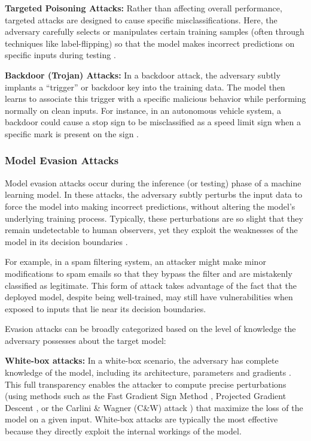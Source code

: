 \documentclass[conference]{IEEEtran}
\begin{document}
\textbf{Targeted Poisoning Attacks:}
Rather than affecting overall performance, targeted attacks are designed to cause specific misclassifications. Here, the adversary carefully selects or manipulates certain training samples (often through techniques like label-flipping) so that the model makes incorrect predictions on specific inputs during testing \cite{pauling2022tutorial}.

\textbf{Backdoor (Trojan) Attacks:}
In a backdoor attack, the adversary subtly implants a “trigger” or backdoor key into the training data. The model then learns to associate this trigger with a specific malicious behavior while performing normally on clean inputs. For instance, in an autonomous vehicle system, a backdoor could cause a stop sign to be misclassified as a speed limit sign when a specific mark is present on the sign \cite{chen2017targeted}.


\subsubsection{Model Evasion Attacks}
Model evasion attacks occur during the inference (or testing) phase of a machine learning model. In these attacks, the adversary subtly perturbs the input data to force the model into making incorrect predictions, without altering the model’s underlying training process. Typically, these perturbations are so slight that they remain undetectable to human observers, yet they exploit the weaknesses of the model in its decision boundaries \cite{golla2023security, pauling2022tutorial}.

For example, in a spam filtering system, an attacker might make minor modifications to spam emails so that they bypass the filter and are mistakenly classified as legitimate. This form of attack takes advantage of the fact that the deployed model, despite being well-trained, may still have vulnerabilities when exposed to inputs that lie near its decision boundaries.

Evasion attacks can be broadly categorized based on the level of knowledge the adversary possesses about the target model:

\textbf{White-box attacks:}
In a white-box scenario, the adversary has complete knowledge of the model, including its architecture, parameters and gradients \cite{ren2020adversarial}. This full transparency enables the attacker to compute precise perturbations (using methods such as the Fast Gradient Sign Method \cite{naqvi2023adversarial}, Projected Gradient Descent \cite{deng2020universal}, or the Carlini \& Wagner (C\&W) attack \cite{pujari2022approach}) that maximize the loss of the model on a given input. White-box attacks are typically the most effective because they directly exploit the internal workings of the model.
\end{document}
